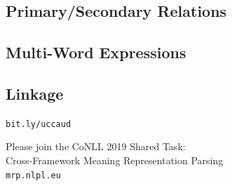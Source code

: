 \documentclass[extrafontsizes,60pt,twocolumn]{memoir}
\begin{document}
\subsection*{Primary/Secondary Relations}

\subsection*{Multi-Word Expressions}

\subsection*{Linkage}



\begin{center}
\LARGE\texttt{bit.ly/{\color{blue}ucca}{\color{red}ud}}
\end{center}

\begin{minipage}{.4\columnwidth}
\color{DarkSlateGray}
\tiny
\setlength\bibitemsep{0pt}


\end{minipage}
\hspace{1in}
\begin{minipage}{.475\columnwidth}
\color{Black}
\begin{adjustbox}{margin=3mm,frame,minipage=1.15\columnwidth}
\centering\Large
Please join the CoNLL 2019 Shared Task: \\
Cross-Framework Meaning Representation Parsing \\
\Large\texttt{{\color{violet}mrp}.{\color{red}nlpl}.{\color{blue}eu}}
\end{adjustbox}
\end{minipage}
\end{document}
